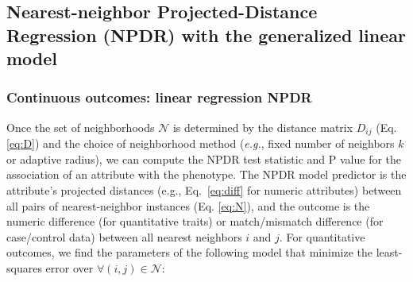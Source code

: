 \documentclass[10pt]{article}
\begin{document}
\subsection{Nearest-neighbor Projected-Distance Regression (NPDR) with the generalized linear model}

\subsubsection{Continuous outcomes: linear regression NPDR}\label{sec:regress}

Once the set of neighborhoods $\mathcal{N}$ is determined by the distance matrix $D_{ij}$ (Eq. \ref{eq:D}) and the choice of neighborhood method ({\it e.g.}, fixed number of neighbors $k$ or adaptive radius), we can compute the NPDR test statistic and P value for the association of an attribute with the phenotype. The NPDR model predictor is the attribute's projected distances (e.g., Eq.~\ref{eq:diff} for numeric attributes) between all pairs of nearest-neighbor instances (Eq. \ref{eq:N}), and the outcome is the numeric difference (for quantitative traits) or match/mismatch difference (for case/control data) between all nearest neighbors $i$ and $j$. For quantitative outcomes, we find the parameters of the following model that minimize the least-squares error over $\forall(i,j) \in \mathcal{N}$: 

\end{document}
